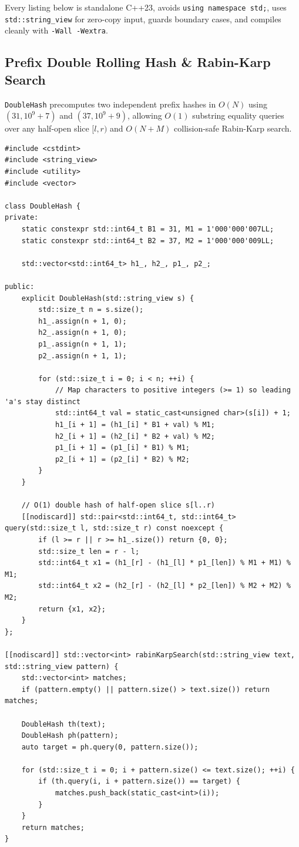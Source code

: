 \documentclass[11pt,a4paper]{article}
\theoremstyle{definition}
\begin{document}
Every listing below is standalone C++23, avoids \texttt{using namespace std;}, uses \texttt{std::string\_view} for zero-copy input, guards boundary cases, and compiles cleanly with \texttt{-Wall -Wextra}.

\subsection{Prefix Double Rolling Hash \& Rabin-Karp Search}

\texttt{DoubleHash} precomputes two independent prefix hashes in $O(N)$ using $(31, 10^9 + 7)$ and $(37, 10^9 + 9)$, allowing $O(1)$ substring equality queries over any half-open slice $[l, r)$ and $O(N + M)$ collision-safe Rabin-Karp search.

\begin{lstlisting}[caption={Collision-Safe Double Rolling Hash and O(N + M) Rabin-Karp Search}]
#include <cstdint>
#include <string_view>
#include <utility>
#include <vector>

class DoubleHash {
private:
    static constexpr std::int64_t B1 = 31, M1 = 1'000'000'007LL;
    static constexpr std::int64_t B2 = 37, M2 = 1'000'000'009LL;

    std::vector<std::int64_t> h1_, h2_, p1_, p2_;

public:
    explicit DoubleHash(std::string_view s) {
        std::size_t n = s.size();
        h1_.assign(n + 1, 0);
        h2_.assign(n + 1, 0);
        p1_.assign(n + 1, 1);
        p2_.assign(n + 1, 1);

        for (std::size_t i = 0; i < n; ++i) {
            // Map characters to positive integers (>= 1) so leading 'a's stay distinct
            std::int64_t val = static_cast<unsigned char>(s[i]) + 1;
            h1_[i + 1] = (h1_[i] * B1 + val) % M1;
            h2_[i + 1] = (h2_[i] * B2 + val) % M2;
            p1_[i + 1] = (p1_[i] * B1) % M1;
            p2_[i + 1] = (p2_[i] * B2) % M2;
        }
    }

    // O(1) double hash of half-open slice s[l..r)
    [[nodiscard]] std::pair<std::int64_t, std::int64_t> query(std::size_t l, std::size_t r) const noexcept {
        if (l >= r || r >= h1_.size()) return {0, 0};
        std::size_t len = r - l;
        std::int64_t x1 = (h1_[r] - (h1_[l] * p1_[len]) % M1 + M1) % M1;
        std::int64_t x2 = (h2_[r] - (h2_[l] * p2_[len]) % M2 + M2) % M2;
        return {x1, x2};
    }
};

[[nodiscard]] std::vector<int> rabinKarpSearch(std::string_view text, std::string_view pattern) {
    std::vector<int> matches;
    if (pattern.empty() || pattern.size() > text.size()) return matches;

    DoubleHash th(text);
    DoubleHash ph(pattern);
    auto target = ph.query(0, pattern.size());

    for (std::size_t i = 0; i + pattern.size() <= text.size(); ++i) {
        if (th.query(i, i + pattern.size()) == target) {
            matches.push_back(static_cast<int>(i));
        }
    }
    return matches;
}
\end{lstlisting}
\end{document}
